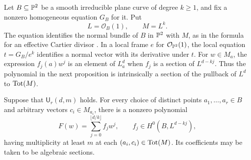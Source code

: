 Let $B\subseteq\mathbb P^2$ be a smooth irreducible plane curve of degree
$k\ge1$, and fix a nonzero homogeneous equation $G_B$ for it.  Put
\[
 L=\mathcal O_B(1),\qquad M=L^k.
\]
The equation identifies the normal bundle of $B$ in $\mathbb P^2$ with $M$,
as in the formula for an effective Cartier divisor
\cite[Tag~0B3P]{Stacks}.  In a local frame $e$ for
$\mathcal O_{\mathbb P^2}(1)$, the local equation
$t=G_B/e^k$ identifies a normal vector with its derivative under $t$.
For $w\in M_a$, the expression $f_j(a)w^j$ is an element of $L_a^d$
when $f_j$ is a section of $L^{d-kj}$.  Thus the polynomial in the next
proposition is intrinsically a section of the pullback of $L^d$ to
$\operatorname{Tot}(M)$.

\begin{proposition}
\label{prop:normal-polynomial}
Suppose that $\mathsf U_r(d,m)$ holds.  For every choice of distinct
points $a_1,\ldots,a_r\in B$ and arbitrary vectors $c_i\in M_{a_i}$,
there is a nonzero polynomial
\begin{equation}
\label{eq:normal-polynomial}
 F(w)=\sum_{j=0}^{\lfloor d/k\rfloor}f_jw^j,
 \qquad f_j\in H^0(B,L^{d-kj}),
\end{equation}
having multiplicity at least $m$ at each $(a_i,c_i)\in\operatorname{Tot}(M)$.
Its coefficients may be taken to be algebraic sections.
\end{proposition}

